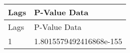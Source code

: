 \begin{tabular}{ll}
\hline
 Lags   & P-Value Data            \\
\hline
 Lags   & P-Value Data            \\
 1      & 1.8015579492416868e-155 \\
\hline
\end{tabular}